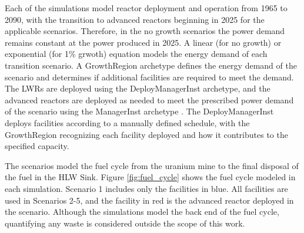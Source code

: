Each of the simulations model reactor deployment and operation from 1965 to 
2090, with the transition to advanced reactors beginning 
in 2025 for the applicable scenarios. Therefore, in the no growth scenarios 
the power demand remains constant 
at the power produced in 2025. A linear (for no growth) or exponential 
(for 1\% grwoth) equation models the energy demand of each transition 
scenario. A \Cycamore GrowthRegion archetype\cite{huff_fundamental_2016}
defines the energy demand of the scenario and determines if additional 
facilities are required to meet the demand. The \glspl{LWR} are deployed 
using the \Cycamore DeployManagerInst archetype, and the 
advanced reactors are deployed as needed to meet the prescribed power demand 
of the scenario using the \Cycamore ManagerInst archetype 
\cite{huff_fundamental_2016}. The \Cycamore DeployManagerInst deploys facilities 
according to a manually defined schedule, with the \Cycamore GrowthRegion 
recognizing each facility deployed and how it contributes 
to the specified capacity. 

The scenarios model the fuel cycle from the uranium mine to the final 
disposal of the fuel in the \gls{HLW} Sink. Figure 
\ref{fig:fuel_cycle} shows the fuel cycle modeled in each simulation. Scenario 
1 includes only the facilities in blue. All facilities are used in Scenarios 
2-5, and the facility in red is the advanced reactor deployed in the 
scenario. Although the simulations model the back end of the fuel 
cycle, quantifying any waste is considered outside the 
scope of this work. 

